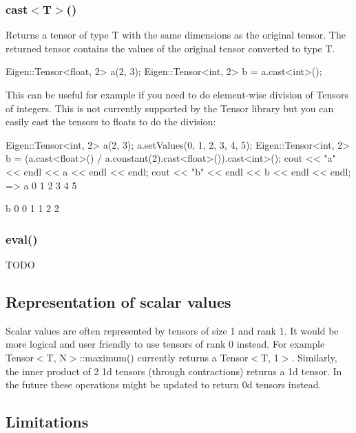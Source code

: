 \subsubsection*{cast$<$\+T$>$()}

Returns a tensor of type T with the same dimensions as the original tensor. The returned tensor contains the values of the original tensor converted to type T. \begin{DoxyVerb}Eigen::Tensor<float, 2> a(2, 3);
Eigen::Tensor<int, 2> b = a.cast<int>();
\end{DoxyVerb}


This can be useful for example if you need to do element-\/wise division of Tensors of integers. This is not currently supported by the Tensor library but you can easily cast the tensors to floats to do the division\+: \begin{DoxyVerb}Eigen::Tensor<int, 2> a(2, 3);
a.setValues({{0, 1, 2}, {3, 4, 5}});
Eigen::Tensor<int, 2> b =
    (a.cast<float>() / a.constant(2).cast<float>()).cast<int>();
cout << "a" << endl << a << endl << endl;
cout << "b" << endl << b << endl << endl;
=>
a
0 1 2
3 4 5

b
0 0 1
1 2 2
\end{DoxyVerb}


\subsubsection*{eval()}

T\+O\+DO

\subsection*{Representation of scalar values}

Scalar values are often represented by tensors of size 1 and rank 1. It would be more logical and user friendly to use tensors of rank 0 instead. For example Tensor$<$\+T, N$>$\+::maximum() currently returns a Tensor$<$\+T, 1$>$. Similarly, the inner product of 2 1d tensors (through contractions) returns a 1d tensor. In the future these operations might be updated to return 0d tensors instead.

\subsection*{Limitations}


